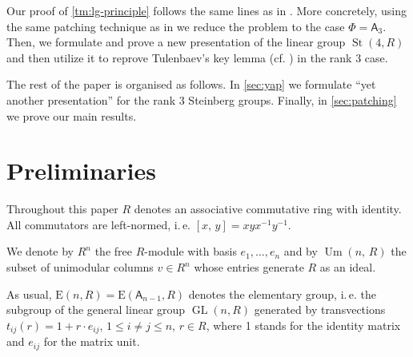 \documentclass[11pt]{amsart}
\theoremstyle{plain} \declaretheorem[name=Theorem, Refname={Theorem,Theorems}]{tm} \Crefname{tm}{Theorem}{Theorems}
\numberwithin{equation}{section}
\theoremstyle{definition} \newtheorem{df}[lm]{Definition} \Crefname{df}{Definition}{Definitions}
\theoremstyle{remark} \newtheorem{rk}[lm]{Remark} \Crefname{rk}{Remark}{Remarks}
\newcommand{\E}{{\mathrm{E}}}
\newcommand{\Um}{\mathop{\mathrm{Um}}\nolimits}
\newcommand{\St}{\mathop{\mathrm{St}}\nolimits}
\newcommand{\GL}{\mathop{\mathrm{GL}}\nolimits}
\newcommand{\SL}{\mathop{\mathrm{SL}}\nolimits}
\newcommand{\inv}{^{-1}}
\newcommand{\rA}{\mathsf{A}}
\begin{document}
Our proof of \cref{tm:lg-principle} follows the same lines as in \cite[Theorem~1]{SCh}.
More concretely, using the same patching technique as in \cite{SCh} we reduce the problem to the case $\Phi=\rA_3$.
Then, we formulate and prove a new presentation of the linear group $\St(4, R)$ and then utilize it to reprove 
Tulenbaev's key lemma (cf. \cite[Lemma~2.3]{Tul}) in the rank $3$ case.

The rest of the paper is organised as follows. 
In \cref{sec:yap} we formulate ``yet another presentation'' for the rank $3$ Steinberg groups.
Finally, in \cref{sec:patching} we prove our main results.

\section{Preliminaries} \label{sec:prelim}
Throughout this paper $R$ denotes an associative commutative ring with identity.
All commutators are left-normed, i.\,e. $[x,\,y]=xyx\inv y\inv$. 




We denote by $R^n$ the free $R$-module with basis $e_1,\ldots,e_n$ and by $\Um(n,\,R)$ the subset of unimodular columns $v\in R^n$ 
whose entries generate $R$ as an ideal.

As usual, $\E(n, R)=\E(\rA_{n-1}, R)$ denotes the elementary group, i.\,e. the subgroup of the general linear group $\GL(n, R)$ generated by transvections
$t_{ij}(r)=1+r \cdot e_{ij}$, $1\leq i\neq j\leq n$, $r\in R$,
where 1 stands for the identity matrix and $e_{ij}$ for the matrix unit.
\end{document}
